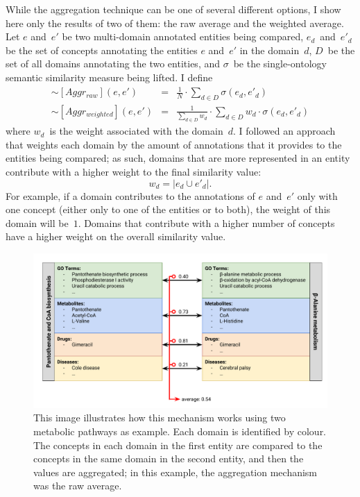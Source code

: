 While the aggregation technique can be one of several different options, I show here only the results of two of them: the raw average and the weighted average. Let $e$ and~$e'$ be two multi-domain annotated entities being compared, $e_d\,$ and~$e'_d\,$ be the set of concepts annotating the entities $e$ and~$e'$ in the domain~$d$, $D$~be the set of all domains annotating the two entities, and $\sigma$~be the single-ontology semantic similarity measure being lifted. I define
\begin{eqnarray}
    \sim[Aggr_{raw}](e, e') &=&
    \frac{1}{N} \cdot
    \sum_{d \in D} \sigma(e_d, e'_d)
    \label{eq:sim-aggr-raw} \\
    \sim[Aggr_{weighted}](e, e') &=&
    \frac{1}{\sum_{d \in D} w_d} \cdot
    \sum_{d \in D} w_d \cdot \sigma(e_d, e'_d)
    \label{eq:sim-aggr-weighted}
\end{eqnarray}
where $w_d$~is the weight associated with the domain~$d$. I followed an approach that weights each domain by the amount of annotations that it provides to the entities being compared; as such, domains that are more represented in an entity contribute with a higher weight to the final similarity value:
\begin{equation}
    w_d = \left\vert e_d \cup e'_d \right\vert.
\end{equation}
For example, if a domain contributes to the annotations of $e$ and~$e'$ only with one concept (either only to one of the entities or to both), the weight of this domain will be~$1$. Domains that contribute with a higher number of concepts have a higher weight on the overall similarity value.

\begin{figure}
    \centering
    \includegraphics[width=\linewidth]{images/multi-aggregative.pdf}
    \caption[The aggregative approach]{This image illustrates how this mechanism works using two metabolic pathways as example. Each domain is identified by colour. The concepts in each domain in the first entity are compared to the concepts in the same domain in the second entity, and then the values are aggregated; in this example, the aggregation mechanism was the raw average.}
    \label{fig:aggregative}
\end{figure}

